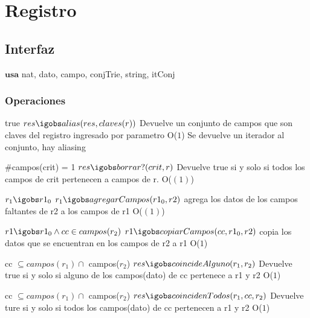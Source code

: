 
\section{Registro}

\subsection{Interfaz}

$\textbf{usa}$ {nat, dato, campo, conjTrie, string, itConj}




\subsubsection*{Operaciones}





 {true}
 {$res \igobs alias(res, claves(r))$}
 {Devuelve un conjunto de campos que son claves del registro ingresado por parametro}
 {O($1$)}
 {Se devuelve un iterador al conjunto, hay aliasing}

 {$\#$campos(crit) = 1}
 {$res \igobs borrar?(crit, r)$}
 {Devuelve true si y solo si todos los campos de crit pertenecen a campos de r.}
 {O($(1)$)} 
 {}

 {$ r_1 \igobs r1_0 $}
 {$r_1 \igobs agregarCampos(r1_0, r2) $}
 {agrega los datos de los campos faltantes de r2 a los campos de r1}
 {O($(1)$)} 
 {}
 
{$r1 \igobs r1_0 \land  cc \in campos(r_2) $}
{$r1 \igobs copiarCampos(cc, r1_0, r2)$}
{copia los datos que se encuentran en los campos de r2 a r1}
{O($1$)}
{}%

 {cc $\subseteq campos(r_1)\cap$ campos($r_2$)}
 {$res \igobs coincideAlguno(r_1, r_2)$}
 {Devuelve true si y solo si alguno de los campos(dato) de cc pertenece a r1 y r2}
 {O($1$)}
 {}
 
 {cc $\subseteq campos(r_1) \cap$ campos($r_2$)}
 {$res \igobs coincidenTodos(r_1, cc, r_2) $}
 {Devuelve ture si y solo si todos los campos(dato) de cc pertenecen a r1 y r2}
 {O($1$) } 
 {}
 
